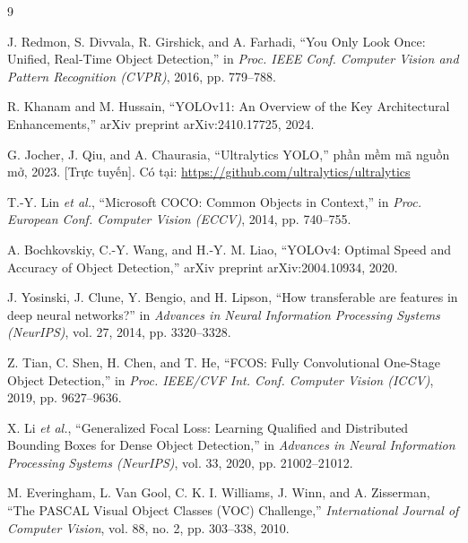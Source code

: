 \documentclass[11pt,a4paper]{article}
\begin{document}
\begin{thebibliography}{9}

J. Redmon, S. Divvala, R. Girshick, and A. Farhadi,
``You Only Look Once: Unified, Real-Time Object Detection,''
in \emph{Proc. IEEE Conf. Computer Vision and Pattern Recognition (CVPR)}, 2016, pp. 779--788.

R. Khanam and M. Hussain,
``YOLOv11: An Overview of the Key Architectural Enhancements,''
arXiv preprint arXiv:2410.17725, 2024.

G. Jocher, J. Qiu, and A. Chaurasia,
``Ultralytics YOLO,'' phần mềm mã nguồn mở, 2023. [Trực tuyến]. Có tại:
\url{https://github.com/ultralytics/ultralytics}

T.-Y. Lin \emph{et al.},
``Microsoft COCO: Common Objects in Context,''
in \emph{Proc. European Conf. Computer Vision (ECCV)}, 2014, pp. 740--755.

A. Bochkovskiy, C.-Y. Wang, and H.-Y. M. Liao,
``YOLOv4: Optimal Speed and Accuracy of Object Detection,''
arXiv preprint arXiv:2004.10934, 2020.

J. Yosinski, J. Clune, Y. Bengio, and H. Lipson,
``How transferable are features in deep neural networks?''
in \emph{Advances in Neural Information Processing Systems (NeurIPS)}, vol. 27, 2014, pp. 3320--3328.

Z. Tian, C. Shen, H. Chen, and T. He,
``FCOS: Fully Convolutional One-Stage Object Detection,''
in \emph{Proc. IEEE/CVF Int. Conf. Computer Vision (ICCV)}, 2019, pp. 9627--9636.

X. Li \emph{et al.},
``Generalized Focal Loss: Learning Qualified and Distributed Bounding Boxes for Dense Object
Detection,''
in \emph{Advances in Neural Information Processing Systems (NeurIPS)}, vol. 33, 2020, pp.
21002--21012.

M. Everingham, L. Van Gool, C. K. I. Williams, J. Winn, and A. Zisserman,
``The PASCAL Visual Object Classes (VOC) Challenge,''
\emph{International Journal of Computer Vision}, vol. 88, no. 2, pp. 303--338, 2010.

\end{thebibliography}
\end{document}
